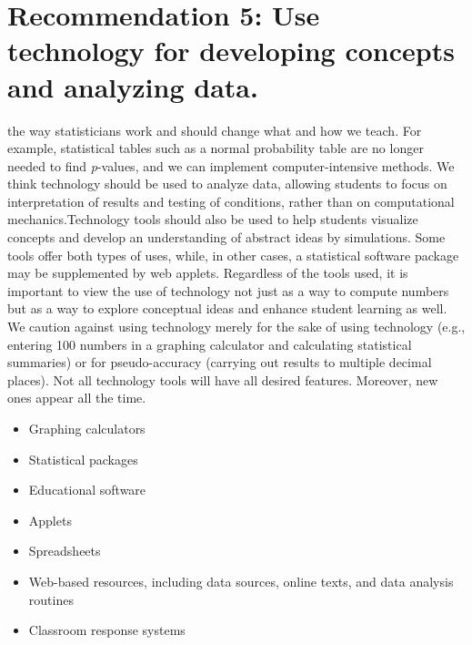 \documentclass[twoside,openany]{tufte-book}
\begin{document}
\section{\textbf{Recommendation 5: Use technology for developing concepts and analyzing data.}}
 
  the way statisticians work and should change what and how we teach.  For example, statistical tables such as a normal probability table are no longer needed to find \textit{p}-values, and we can implement computer-intensive methods. We think technology should be used to analyze data, allowing students to focus on interpretation of results and testing of conditions, rather than on computational mechanics.Technology tools should also be used to help students visualize concepts and develop an understanding of abstract ideas by simulations. Some tools offer both types of uses, while, in other cases, a statistical software package may be supplemented by web applets. Regardless of the tools used, it is important to view the use of technology not just as a way to compute numbers but as a way to explore conceptual ideas and enhance student learning as well. We caution against using technology merely for the sake of using technology (e.g., entering 100 numbers in a graphing calculator and calculating statistical summaries) or for pseudo-accuracy (carrying out results to multiple decimal places). Not all technology tools will have all desired features. Moreover, new ones appear all the time.\\
\vspace{.2in}
 
\noindent{}

\renewcommand\labelitemi{$\filledsquare$}

\begin{itemize}[leftmargin=1cm, itemsep=.2em]
\item Graphing calculators
\item Statistical packages
\item Educational software
\item Applets
\item Spreadsheets
\item Web-based resources, including data sources, online texts, and data analysis routines
\item Classroom response systems
\end{itemize}
 
\end{document}
